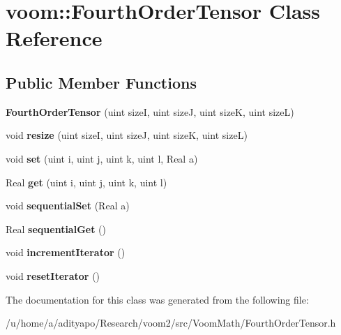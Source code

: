 \hypertarget{classvoom_1_1_fourth_order_tensor}{
\section{voom::FourthOrderTensor Class Reference}
\label{classvoom_1_1_fourth_order_tensor}
}
\subsection*{Public Member Functions}
\begin{DoxyCompactItemize}
\item 
\hypertarget{classvoom_1_1_fourth_order_tensor_ad110f2702da6eefaeb85f794fca3f147}{
{\bfseries FourthOrderTensor} (uint sizeI, uint sizeJ, uint sizeK, uint sizeL)}
\label{classvoom_1_1_fourth_order_tensor_ad110f2702da6eefaeb85f794fca3f147}

\item 
\hypertarget{classvoom_1_1_fourth_order_tensor_a9feabde2ff5701e34f3f25162fe9366a}{
void {\bfseries resize} (uint sizeI, uint sizeJ, uint sizeK, uint sizeL)}
\label{classvoom_1_1_fourth_order_tensor_a9feabde2ff5701e34f3f25162fe9366a}

\item 
\hypertarget{classvoom_1_1_fourth_order_tensor_a31b2d9eeb1f3f3307b4ab5b2f720dfcb}{
void {\bfseries set} (uint i, uint j, uint k, uint l, Real a)}
\label{classvoom_1_1_fourth_order_tensor_a31b2d9eeb1f3f3307b4ab5b2f720dfcb}

\item 
\hypertarget{classvoom_1_1_fourth_order_tensor_a3ce8292721cc43e45b9464445bcbe041}{
Real {\bfseries get} (uint i, uint j, uint k, uint l)}
\label{classvoom_1_1_fourth_order_tensor_a3ce8292721cc43e45b9464445bcbe041}

\item 
\hypertarget{classvoom_1_1_fourth_order_tensor_a66a3683d97f37127ada6606a848d0371}{
void {\bfseries sequentialSet} (Real a)}
\label{classvoom_1_1_fourth_order_tensor_a66a3683d97f37127ada6606a848d0371}

\item 
\hypertarget{classvoom_1_1_fourth_order_tensor_aa992156cd730df3a2d2a85924883b2e2}{
Real {\bfseries sequentialGet} ()}
\label{classvoom_1_1_fourth_order_tensor_aa992156cd730df3a2d2a85924883b2e2}

\item 
\hypertarget{classvoom_1_1_fourth_order_tensor_a6bc0e4decf22e3ce61738bc43d4fe64d}{
void {\bfseries incrementIterator} ()}
\label{classvoom_1_1_fourth_order_tensor_a6bc0e4decf22e3ce61738bc43d4fe64d}

\item 
\hypertarget{classvoom_1_1_fourth_order_tensor_ac9dbccb04a7c2ad963dd13a8090bea2b}{
void {\bfseries resetIterator} ()}
\label{classvoom_1_1_fourth_order_tensor_ac9dbccb04a7c2ad963dd13a8090bea2b}

\end{DoxyCompactItemize}


The documentation for this class was generated from the following file:\begin{DoxyCompactItemize}
\item 
/u/home/a/adityapo/Research/voom2/src/VoomMath/FourthOrderTensor.h\end{DoxyCompactItemize}
